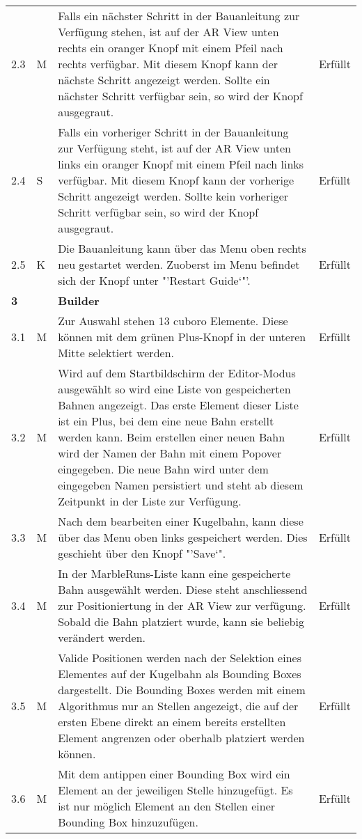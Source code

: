\begin{longtable}{l l p{10cm} l}
	2.3 & M & Falls ein nächster Schritt in der Bauanleitung zur Verfügung stehen, ist auf der AR View unten rechts ein oranger Knopf mit einem Pfeil nach rechts verfügbar. Mit diesem Knopf kann der nächste Schritt angezeigt werden. Sollte ein nächster Schritt verfügbar sein, so wird der Knopf ausgegraut. & Erfüllt \\
	2.4 & S & Falls ein vorheriger Schritt in der Bauanleitung zur Verfügung steht, ist auf der AR View unten links ein oranger Knopf mit einem Pfeil nach links verfügbar. Mit diesem Knopf kann der vorherige Schritt angezeigt werden. Sollte kein vorheriger Schritt verfügbar sein, so wird der Knopf ausgegraut. & Erfüllt \\
	2.5 & K & Die Bauanleitung kann über das Menu oben rechts neu gestartet werden. Zuoberst im Menu befindet sich der Knopf unter "'Restart Guide`"'. & Erfüllt \\
	\hline
	\textbf{3} & & \textbf{Builder} & \\
	\hline
	3.1 & M & Zur Auswahl stehen 13 cuboro Elemente. Diese können mit dem grünen Plus-Knopf in der unteren Mitte selektiert werden. & Erfüllt \\
	3.2 & M & Wird auf dem Startbildschirm der Editor-Modus ausgewählt so wird eine Liste von gespeicherten Bahnen angezeigt. Das erste Element dieser Liste ist ein Plus, bei dem eine neue Bahn erstellt werden kann. Beim erstellen einer neuen Bahn wird der Namen der Bahn mit einem Popover eingegeben. Die neue Bahn wird unter dem eingegeben Namen persistiert und steht ab diesem Zeitpunkt in der Liste zur Verfügung. & Erfüllt \\
	3.3 & M & Nach dem bearbeiten einer Kugelbahn, kann diese über das Menu oben links gespeichert werden. Dies geschieht über den Knopf "'Save`". & Erfüllt \\
	3.4 & M & In der MarbleRuns-Liste kann eine gespeicherte Bahn ausgewählt werden. Diese steht anschliessend zur Positioniertung in der AR View zur verfügung. Sobald die Bahn platziert wurde, kann sie beliebig verändert werden. & Erfüllt \\
	3.5 & M & Valide Positionen werden nach der Selektion eines Elementes auf der Kugelbahn als Bounding Boxes dargestellt. Die Bounding Boxes werden mit einem Algorithmus nur an Stellen angezeigt, die auf der ersten Ebene direkt an einem bereits erstellten Element angrenzen oder oberhalb platziert werden können. & Erfüllt \\
	3.6 & M & Mit dem antippen einer Bounding Box wird ein Element an der jeweiligen Stelle hinzugefügt. Es ist nur möglich Element an den Stellen einer Bounding Box hinzuzufügen. & Erfüllt \\

\end{longtable}
